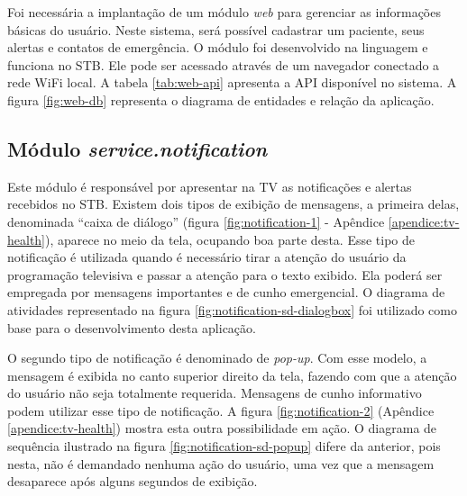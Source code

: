 Foi necessária a implantação de um módulo \textit{web} para gerenciar as 
informações básicas do usuário. Neste sistema, será possível cadastrar um 
paciente, seus alertas e contatos de emergência. O módulo \web[] foi desenvolvido
na linguagem \python[] e funciona no STB. Ele pode ser acessado através de
um navegador conectado a rede WiFi local. A tabela \ref{tab:web-api} apresenta
a API disponível no sistema. A figura \vref{fig:web-db} representa o diagrama
de entidades e relação da aplicação.


\subsection{Módulo \textit{service.notification}}\label{subsubsec:notification}

Este módulo é responsável por apresentar na TV as notificações e alertas
recebidos no STB. Existem dois tipos de exibição de mensagens, a primeira
delas, denominada ``caixa de diálogo'' (figura \vref{fig:notification-1} -
Apêndice \ref{apendice:tv-health}), aparece no meio da tela, ocupando boa parte
desta.  Esse tipo de notificação é utilizada quando é necessário tirar a
atenção do usuário da programação televisiva e passar a atenção para o texto
exibido.  Ela poderá ser empregada por mensagens importantes e de cunho
emergencial.  O diagrama de atividades representado na figura
\ref{fig:notification-sd-dialogbox} foi utilizado como base para o
desenvolvimento desta aplicação.



O segundo tipo de notificação é denominado de \textit{pop-up}. Com esse modelo,
a mensagem é exibida no canto superior direito da tela, fazendo com que a
atenção do usuário não seja totalmente requerida. Mensagens de cunho informativo
podem utilizar esse tipo de notificação. A figura \ref{fig:notification-2} 
(Apêndice \ref{apendice:tv-health}) mostra esta outra possibilidade em ação.
O diagrama de sequência ilustrado na figura \ref{fig:notification-sd-popup}
difere da anterior, pois nesta, não é demandado nenhuma
ação do usuário, uma vez que a mensagem desaparece após alguns segundos de exibição.

